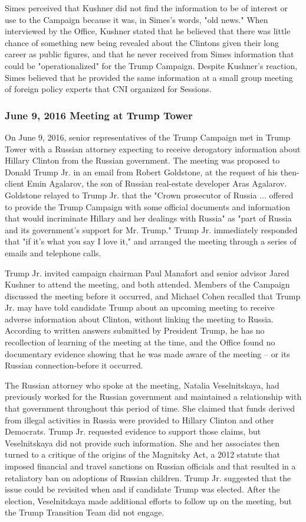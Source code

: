 Simes perceived that Kushner did not find the information to be of interest or use to the Campaign because it was, in Simes's words, "old news."%
When interviewed by the Office, Kushner stated that he believed that there was little chance of something new being revealed about the Clintons given their long career as public figures, and that he never received from Simes information that could be "operationalized" for the Trump Campaign.%
Despite Kushner's reaction, Simes believed that he provided the same information at a small group meeting of foreign policy experts that CNI organized for Sessions.%

\subsubsection{June 9, 2016 Meeting at Trump Tower}

On June 9, 2016, senior representatives of the Trump Campaign met in Trump Tower with a Russian attorney expecting to receive derogatory information about Hillary Clinton from the Russian government.
The meeting was proposed to Donald Trump Jr. in an email from Robert Goldstone, at the request of his then-client Emin Agalarov, the son of Russian real-estate developer Aras Agalarov.
Goldstone relayed to Trump Jr. that the "Crown prosecutor of Russia ... offered to provide the Trump Campaign with some official documents and information that would incriminate Hillary and her dealings with Russia" as "part of Russia and its government's support for Mr. Trump."
Trump Jr. immediately responded that "if it's what you say I love it," and arranged the meeting through a series of emails and telephone calls.

Trump Jr. invited campaign chairman Paul Manafort and senior advisor Jared Kushner to attend the meeting, and both attended.
Members of the Campaign discussed the meeting before it occurred, and Michael Cohen recalled that Trump Jr. may have told candidate Trump about an upcoming meeting to receive adverse information about Clinton, without linking the meeting to Russia.
According to written answers submitted by President Trump, he has no recollection of learning of the meeting at the time, and the Office found no documentary evidence showing that he was made aware of the meeting -- or its Russian connection-before it occurred.

The Russian attorney who spoke at the meeting, Natalia Veselnitskaya, had previously worked for the Russian government and maintained a relationship with that government throughout this period of time.
She claimed that funds derived from illegal activities in Russia were provided to Hillary Clinton and other Democrats.
Trump Jr. requested evidence to support those claims, but Veselnitskaya did not provide such information.
She and her associates then turned to a critique of the origins of the Magnitsky Act, a 2012 statute that imposed financial and travel sanctions on Russian officials and that resulted in a retaliatory ban on adoptions of Russian children.
Trump Jr. suggested that the issue could be revisited when and if candidate Trump was elected.
After the election, Veselnitskaya made additional efforts to follow up on the meeting, but the Trump Transition Team did not engage.

